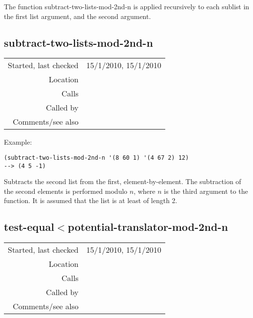 \noindent The function subtract-two-lists-mod-2nd-n is
applied recursively to each sublist in the first list
argument, and the second argument.


\subsection*{subtract-two-lists-mod-2nd-n}\label{fun:subtract-two-lists-mod-2nd-n}

\vspace{0.3cm}
\begin{tabular}{r|p{8cm}}
Started, last checked & 15/1/2010, 15/1/2010 \\
Location & \nameref{sec:structural-induction-mod} \\
Calls & \nameref{fun:subtract-two-lists} \\
Called by & \nameref{fun:subtract-list-from-each-list-mod-2nd-n} \\
Comments/see also & \nameref{fun:subtract-two-lists}
\end{tabular}

\vspace{0.5cm}
\noindent Example:
\begin{verbatim}
(subtract-two-lists-mod-2nd-n '(8 60 1) '(4 67 2) 12)
--> (4 5 -1)
\end{verbatim}

\noindent Subtracts the second list from the first,
element-by-element. The subtraction of the second
elements is performed modulo $n$, where $n$ is the
third argument to the function. It is assumed that the
list is at least of length 2.


\subsection*{test-equal$<$potential-translator-mod-2nd-n}\label{fun:test-equal<potential-translator-mod-2nd-n}

\vspace{0.3cm}
\begin{tabular}{r|p{8cm}}
Started, last checked & 15/1/2010, 15/1/2010 \\
Location & \nameref{sec:structural-induction-mod} \\
Calls & \nameref{fun:add-two-lists-mod-2nd-n} \\
Called by & \nameref{fun:check-potential-translators-mod-2nd-n} \\
Comments/see also & \nameref{fun:test-equal<potential-translator}
\end{tabular}

